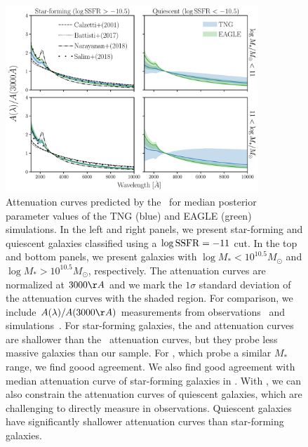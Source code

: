 \begin{figure}
\begin{center}
    \includegraphics[width=0.85\textwidth]{figs/abc_attenuation.pdf}
    \caption{\label{fig:atten}
    Attenuation curves predicted by the \eda~for median posterior parameter
    values of the TNG (blue) and EAGLE (green) simulations. In the left and
    right panels, we present star-forming and quiescent galaxies classified
    using a $\log {\rm SSFR} = -11$ cut. In the top and bottom panels, we
    present galaxies with $\log M_* < 10^{10.5} M_\odot$ and $\log M_* >
    10^{10.5} M_\odot$, respectively. The attenuation curves are normalized at
    $3000\AA$ and we mark the $1\sigma$ standard deviation of the attenuation 
    curves with the shaded region. For comparison, we include
    $A(\lambda)/A(3000\AA)$ measurements from observations~\citep{calzetti2000,
    battisti2017, salim2018} and simulations~\citep{narayanan2018}. 
    For star-forming galaxies, the \cite{calzetti2000} and \cite{battisti2017}
    attenuation curves are shallower than the \eda~attenuation curves, but 
    they probe less massive galaxies than our sample. For \cite{salim2018}, 
    which probe a similar $M_*$ range, we find goood agreement. We also find good agreement with 
    median attenuation curve of star-forming galaxies in \cite{narayanan2018}.
    With \eda, we can also constrain the attenuation curves of quiescent 
    galaxies, which are challenging to directly measure in observations. 
    Quiescent galaxies have significantly shallower attenuation curves than
    star-forming galaxies.
    }
\end{center}
\end{figure}

